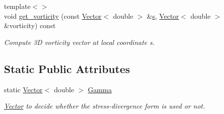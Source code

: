 \begin{DoxyCompactItemize}
\item 
{\footnotesize template$<$$>$ }\\void \hyperlink{classoomph_1_1GeneralisedNewtonianNavierStokesEquations_a9f5de20a733b2ea0927c097d89fe7dba}{get\+\_\+vorticity} (const \hyperlink{classoomph_1_1Vector}{Vector}$<$ double $>$ \&\hyperlink{cfortran_8h_ab7123126e4885ef647dd9c6e3807a21c}{s}, \hyperlink{classoomph_1_1Vector}{Vector}$<$ double $>$ \&vorticity) const
\begin{DoxyCompactList}\small\item\em Compute 3D vorticity vector at local coordinate s. \end{DoxyCompactList}\end{DoxyCompactItemize}
\subsection*{Static Public Attributes}
\begin{DoxyCompactItemize}
\item 
static \hyperlink{classoomph_1_1Vector}{Vector}$<$ double $>$ \hyperlink{classoomph_1_1GeneralisedNewtonianNavierStokesEquations_ab43fecc06e4a688693f1adf839791996}{Gamma}
\begin{DoxyCompactList}\small\item\em \hyperlink{classoomph_1_1Vector}{Vector} to decide whether the stress-\/divergence form is used or not. \end{DoxyCompactList}\end{DoxyCompactItemize}
